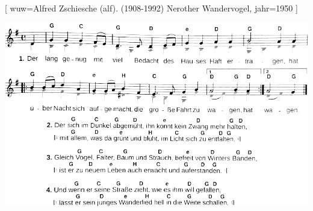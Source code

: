 [
    wuw={Alfred Zschiesche (alf). (1908-1992) Nerother Wandervogel},
    jahr={1950}
]

\includegraphics[width=\textwidth, page=1, draft=false]{Noten/EinJungesLied}

\endsong
